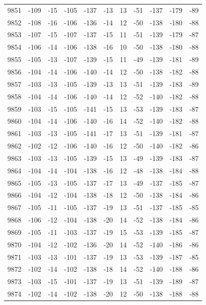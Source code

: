 \begin{table}[H]
\begin{tabular}{lllllllllll}
9851 & -109 & -15 & -105 & -137 & -13 & 13 & -51 & -137 & -179 & -89 \\
9852 & -108 & -16 & -106 & -136 & -14 & 12 & -50 & -138 & -180 & -88 \\
9853 & -107 & -15 & -107 & -137 & -15 & 11 & -51 & -139 & -179 & -87 \\
9854 & -106 & -14 & -106 & -138 & -16 & 10 & -50 & -138 & -180 & -88 \\
9855 & -105 & -13 & -107 & -139 & -15 & 11 & -49 & -139 & -181 & -89 \\
9856 & -104 & -14 & -106 & -140 & -14 & 12 & -50 & -138 & -182 & -88 \\
9857 & -103 & -13 & -105 & -139 & -13 & 13 & -51 & -139 & -183 & -89 \\
9858 & -104 & -14 & -106 & -140 & -14 & 12 & -52 & -140 & -182 & -88 \\
9859 & -103 & -15 & -105 & -141 & -15 & 13 & -53 & -139 & -183 & -87 \\
9860 & -104 & -14 & -106 & -140 & -16 & 14 & -52 & -140 & -182 & -88 \\
9861 & -103 & -13 & -105 & -141 & -17 & 13 & -51 & -139 & -181 & -87 \\
9862 & -102 & -12 & -106 & -140 & -16 & 12 & -50 & -140 & -182 & -86 \\
9863 & -103 & -13 & -105 & -139 & -15 & 13 & -49 & -139 & -183 & -87 \\
9864 & -104 & -14 & -104 & -138 & -16 & 12 & -48 & -138 & -184 & -88 \\
9865 & -105 & -13 & -105 & -137 & -17 & 13 & -49 & -137 & -185 & -87 \\
9866 & -104 & -12 & -104 & -138 & -18 & 12 & -50 & -138 & -184 & -86 \\
9867 & -105 & -11 & -105 & -137 & -19 & 13 & -51 & -137 & -185 & -85 \\
9868 & -106 & -12 & -104 & -138 & -20 & 14 & -52 & -138 & -184 & -86 \\
9869 & -105 & -11 & -103 & -137 & -19 & 15 & -53 & -139 & -185 & -87 \\
9870 & -104 & -12 & -102 & -136 & -20 & 14 & -52 & -140 & -186 & -86 \\
9871 & -103 & -13 & -101 & -137 & -19 & 13 & -53 & -139 & -187 & -85 \\
9872 & -102 & -14 & -102 & -138 & -18 & 14 & -52 & -140 & -188 & -86 \\
9873 & -103 & -15 & -101 & -137 & -19 & 13 & -51 & -139 & -189 & -87 \\
9874 & -102 & -14 & -102 & -138 & -20 & 12 & -50 & -138 & -188 & -88 \\

\end{tabular}
\end{table}
